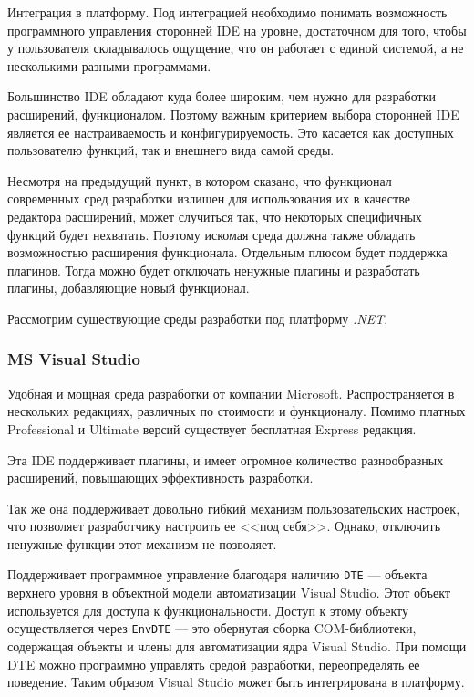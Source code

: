 Интеграция в платформу. Под интеграцией необходимо понимать возможность программного управления сторонней IDE на уровне, достаточном для того, чтобы у пользователя складывалось ощущение, что он работает с единой системой, а не несколькими разными программами.

Большинство IDE обладают куда более широким, чем нужно для разработки расширений, функционалом. Поэтому важным критерием выбора сторонней IDE является ее настраиваемость и конфигурируемость. Это касается как доступных пользователю функций, так и внешнего вида самой среды.

Несмотря на предыдущий пункт, в котором сказано, что функционал современных сред разработки излишен для использования их в качестве редактора расширений, может случиться так, что некоторых специфичных функций будет нехватать. Поэтому искомая среда должна также обладать возможностью расширения функционала. Отдельным плюсом будет поддержка плагинов. Тогда можно будет отключать ненужные плагины и разработать плагины, добавляющие новый функционал.

Рассмотрим существующие среды разработки под платформу {\it .NET}.

\subsubsection{MS Visual Studio}

Удобная и мощная среда разработки от компании Microsoft. Распространяется в нескольких редакциях, различных по стоимости и функционалу. Помимо платных Professional и Ultimate версий существует бесплатная Express редакция.

Эта IDE поддерживает плагины, и имеет огромное количество разнообразных расширений, повышающих эффективность разработки.

Так же она поддерживает довольно гибкий механизм пользовательских настроек, что позволяет разработчику настроить ее <<под себя>>. Однако, отключить ненужные функции этот механизм не позволяет.

Поддерживает программное управление благодаря наличию  {\tt DTE} --- объекта верхнего уровня в объектной модели автоматизации Visual Studio. Этот объект используется для доступа к функциональности. Доступ к этому объекту осуществляется через {\tt EnvDTE} --- это обернутая сборка COM-библиотеки, содержащая объекты и члены для автоматизации ядра Visual Studio. При помощи DTE можно программно управлять средой разработки, переопределять ее поведение. Таким образом Visual Studio может быть интегрирована в платформу.

